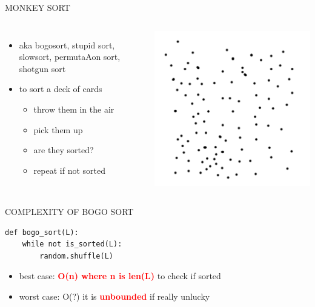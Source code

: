 \documentclass[aspectratio=169]{beamer}
\begin{document}
\begin{frame}{MONKEY SORT}
\begin{columns}
\begin{itemize}
\item aka bogosort, stupid sort, slowsort, permutaAon sort, shotgun sort
\item  to sort a deck of cards
\begin{itemize}
\item throw them in the air
\item pick them up
\item are they sorted?
\item repeat if not sorted
\end{itemize}

\end{itemize}
\includegraphics[scale=1]{graphics/monkey_sort.png}
\end{columns}
\end{frame}

\begin{frame}[fragile]{COMPLEXITY OF BOGO SORT}
\begin{lstlisting}
def bogo_sort(L):
	while not is_sorted(L):
		random.shuffle(L)
\end{lstlisting}
\begin{itemize}
\item best case: \textcolor{red}{\textbf{O(n) where n is len(L)}} to check if sorted
\item worst case: O(?) it is \textcolor{red}{\textbf{unbounded}} if really unlucky

\end{itemize}
\end{frame}
\end{document}

